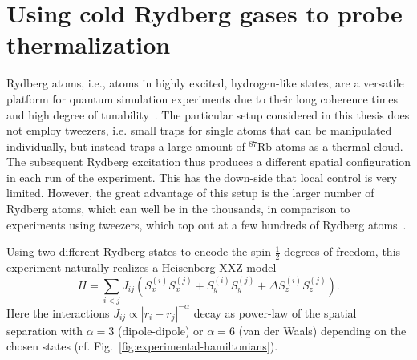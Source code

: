 \section{Using cold Rydberg gases to probe thermalization}\label{sec:Rydberg-experiment}
%
%


Rydberg atoms, i.e., atoms in highly excited, hydrogen-like states, are a versatile platform for quantum simulation experiments due to their long coherence times and high degree of tunability~\cite{whitlockSimulatingQuantumSpin2017,sibalicRydbergPhysics2018,browaeysManybodyPhysicsIndividually2020a,schollQuantumSimulation2D2021}. The particular setup considered in this thesis does not employ tweezers, i.e. small traps for single atoms that can be manipulated individually, but instead traps a large amount of $^{87}$Rb atoms as a thermal cloud. The subsequent Rydberg excitation thus produces a different spatial configuration in each run of the experiment. This has the down-side that local control is very limited. However, the great advantage of this setup is the larger number of Rydberg atoms, which can well be in the thousands, in comparison to experiments using tweezers, which top out at a few hundreds of Rydberg atoms~\cite{browaeysManybodyPhysicsIndividually2020a}.

Using two different Rydberg states to encode the spin-$\frac{1}{2}$ degrees of freedom, this experiment naturally realizes a Heisenberg XXZ model~\cite{pineiroorioliRelaxationIsolatedDipolarInteracting2018,signolesGlassyDynamicsDisordered2021}
\begin{equation}\label{eq:heisenberg-hamiltonian}
	H = \sum_{i<j} J_{ij}\left(S_x^{(i)}S_x^{(j)} + S_y^{(i)}S_y^{(j)} + \Delta S_z^{(i)}S_z^{(j)}\right).
\end{equation}
Here the interactions $J_{ij}\propto |r_i-r_j|^{-\alpha}$ decay as power-law of the spatial separation with $\alpha=3$ (dipole-dipole) or $\alpha=6$ (van der Waals) depending on the chosen states (cf. Fig.~\ref{fig:experimental-hamiltonians}).

